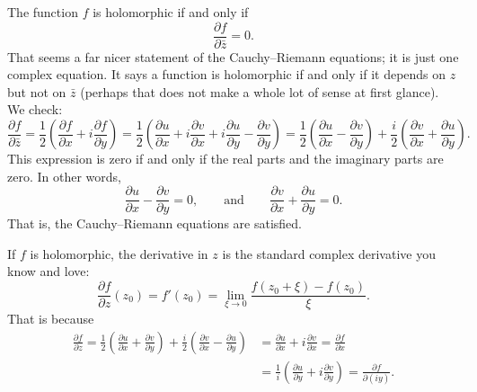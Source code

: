 \documentclass[12pt,openany]{book}
\theoremstyle{plain}
\theoremstyle{remark}
\theoremstyle{definition}
\theoremstyle{exercise}
\theoremstyle{example}
\begin{document}
The function $f$ is holomorphic if and only if
\begin{equation*}
\frac{\partial f}{\partial \bar{z}} = 0 .
\end{equation*}
That seems a far nicer statement of the Cauchy--Riemann equations; it is
just one complex equation.  It says
a function is holomorphic if and only if it depends on $z$ but not on
$\bar{z}$ (perhaps that does not make a whole lot of sense at first
glance).
We check:
\begin{equation*}
\frac{\partial f}{\partial \bar{z}}
=
\frac{1}{2}
\left(
\frac{\partial f}{\partial x} + i
\frac{\partial f}{\partial y}
\right)
=
\frac{1}{2}
\left(
\frac{\partial u}{\partial x}
+ i \frac{\partial v}{\partial x}
+ i \frac{\partial u}{\partial y}
- \frac{\partial v}{\partial y}
\right)
=
\frac{1}{2}
\left(
\frac{\partial u}{\partial x}
- \frac{\partial v}{\partial y}
\right)
+
\frac{i}{2}
\left(
\frac{\partial v}{\partial x}
+ \frac{\partial u}{\partial y}
\right) .
\end{equation*}
This expression is zero if and only if the real parts and the imaginary
parts are zero.  In other words, %
\begin{equation*}
\frac{\partial u}{\partial x}
- \frac{\partial v}{\partial y}
= 0,
\qquad
\text{and}
\qquad
\frac{\partial v}{\partial x}
+ \frac{\partial u}{\partial y} = 0
.
\end{equation*}
That is, the Cauchy--Riemann equations are satisfied.

If $f$ is holomorphic, the derivative in $z$ is the standard complex derivative you know and love:
\begin{equation*}
\frac{\partial f}{\partial z} (z_0)
=
f'(z_0)
=
\lim_{\xi \to 0} \frac{f(z_0+\xi)-f(z_0)}{\xi} .
\end{equation*}
That is because
\begin{equation*}
\begin{split}
\frac{\partial f}{\partial z}
=
\frac{1}{2}
\left(
\frac{\partial u}{\partial x}
+ \frac{\partial v}{\partial y}
\right)
+
\frac{i}{2}
\left( \frac{\partial v}{\partial x} - \frac{\partial u}{\partial y}
\right)
& =
\frac{\partial u}{\partial x}
+ i \frac{\partial v}{\partial x}
 =
\frac{\partial f}{\partial x}
\\
& =
\frac{1}{i} \left(
\frac{\partial u}{\partial y}
+ i
\frac{\partial v}{\partial y}
\right)
 =
\frac{\partial f}{\partial (iy)}
.
\end{split}
\end{equation*}
\end{document}
